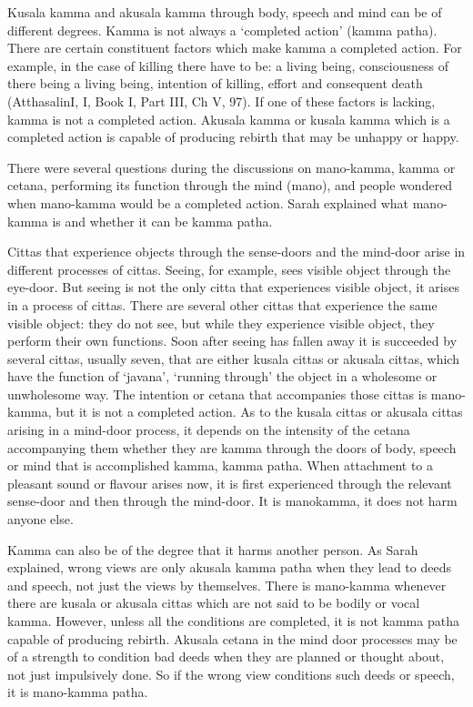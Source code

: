 Kusala kamma and akusala kamma through body, speech and mind can be of 
different degrees. Kamma is not always a `completed action' (kamma patha). 
There are certain constituent factors which make kamma a completed action. 
For example, in the case of killing there have to be: a living being, consciousness of there being a living being, intention of killing, effort and consequent 
death (AtthasalinI, I, Book I, Part III, Ch V, 97). If one of these factors is lacking, kamma is not a completed action. Akusala kamma or kusala kamma which 
is a completed action is capable of producing rebirth that may be unhappy or 
happy. 

There were several questions during the discussions on mano-kamma, kamma 
or cetana, performing its function through the mind (mano), and people wondered when mano-kamma would be a completed action. Sarah explained what 
mano-kamma is and whether it can be kamma patha. 

Cittas that experience objects through the sense-doors and the mind-door arise 
in different processes of cittas. Seeing, for example, sees visible object through 
the eye-door. But seeing is not the only citta that experiences visible object, it 
arises in a process of cittas. There are several other cittas that experience the 
same visible object: they do not see, but while they experience visible object, 
they perform their own functions. Soon after seeing has fallen away it is succeeded by several cittas, usually seven, that are either kusala cittas or akusala 
cittas, which have the function of `javana', `running through' the object in a 
wholesome or unwholesome way. The intention or cetana that accompanies 
those cittas is mano-kamma, but it is not a completed action. As to the kusala 
cittas or akusala cittas arising in a mind-door process, it depends on the intensity of the cetana accompanying them whether they are kamma through the doors 
of body, speech or mind that is accomplished kamma, kamma patha. When attachment to a pleasant sound or flavour arises now, it is first experienced 
through the relevant sense-door and then through the mind-door. It is manokamma, it does not harm anyone else. 

Kamma can also be of the degree that it harms another person. As Sarah explained, wrong views are only akusala kamma patha when they lead to deeds 
and speech, not just the views by themselves. There is mano-kamma whenever 
there are kusala or akusala cittas which are not said to be bodily or vocal kamma. However, unless all the conditions are completed, it is not kamma patha capable of producing rebirth. Akusala cetana in the mind door processes may be 
of a strength to condition bad deeds when they are planned or thought about, not 
just impulsively done. So if the wrong view conditions such deeds or speech, it 
is mano-kamma patha. 

